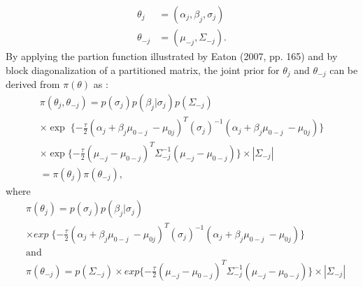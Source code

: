 \documentclass[12pt, fullpage, a4paper]{article}
\begin{document}
\begin{equation}
\begin{array}{cc}
\theta_{j}  &= (\alpha_j, \beta_{j}, \sigma_{j})\\
\theta_{-j} &= (\mu_{-j}, \Sigma_{-j}).
\end{array}
\end{equation}
By applying the partion function illustrated by Eaton (2007, pp. 165)\nocite{10.2307/20461449} and by block diagonalization of a partitioned matrix, the joint prior for $\theta_{j}$ and $\theta_{-j}$ can be derived from $\pi(\theta)$ as :
\begin{equation}
\begin{array}{l}
\pi(\theta_{j}, \theta_{-j}) = p(\sigma_{j})p(\beta_{j}|\sigma_{j})p(\Sigma_{-j})\\
\times \exp\;\{-\frac{\tau}{2}(\alpha_{j} + \beta_{j}\mu_{0-j}\ - \mu_{0j})^{T}(\sigma_{j})^{-1}(\alpha_{j} + \beta_{j}\mu_{0-j}\ - \mu_{0j})\}\\
\times \exp\{-\frac{\tau}{2}(\mu_{-j}-\mu_{0-j})^{T}\Sigma_{-j}^{-1}(\mu_{-j}-\mu_{0-j})\} \times |\Sigma_{-j}|\\
=\pi(\theta_{j})\pi(\theta_{-j}),
\end{array}
\end{equation}
where
\begin{align}
&\pi(\theta_{j}) = p(\sigma_{j})p(\beta_{j}|\sigma_{j}) \nonumber\\
&\times exp\;\{-\frac{\tau}{2}(\alpha_{j} + \beta_{j}\mu_{0-j}\ - \mu_{0j})^{T}(\sigma_{j})^{-1}(\alpha_{j} + \beta_{j}\mu_{0-j}\ - \mu_{0j})\}\\
&\text{and} \nonumber\\
&\pi(\theta_{-j}) = p(\Sigma_{-j})\times exp\{-\frac{\tau}{2}(\mu_{-j}-\mu_{0-j})^{T}\Sigma_{-j}^{-1}(\mu_{-j}-\mu_{0-j})\} \times |\Sigma_{-j}|
\end{align}
\end{document}
